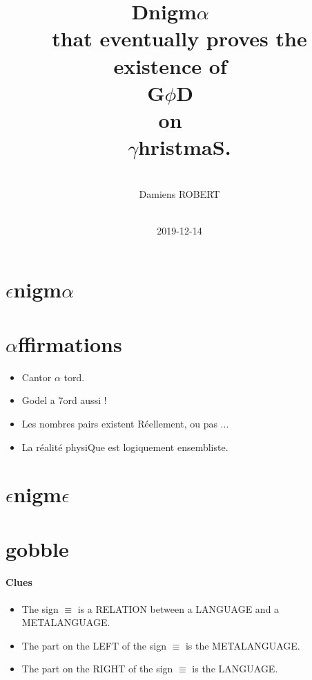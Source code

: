 \documentclass{article}
\title{Dnigm$\alpha$
~\\
that eventually proves the existence of 
~\\
G$\phi$D
~\\
on 
~\\
$\gamma$hristmaS.
}
\date{
~\\
2019-12-14
}
\author{
~\\
Damiens ROBERT
}
\begin{document}
  \maketitle
  \section{$\epsilon$nigm$\alpha$}
    \section{$\alpha$ffirmations}
        \begin{itemize}
          \item
            Cantor $\alpha$ tord.
          \item
            Godel a 7ord aussi ! 
          \item
            Les nombres pairs existent Réellement, ou pas ...
          \item
            La réalité physiQue est logiquement ensembliste.
        \end{itemize}
    \section{$\epsilon$nigm$\epsilon$}
    \section{gobble}
      \paragraph{Clues}
	\begin{itemize}
	  \item
            The sign $\equiv$ is a RELATION between a LANGUAGE and a METALANGUAGE.
	  \item
            The part on the LEFT of the sign $\equiv$ is the METALANGUAGE.
	  \item
            The part on the RIGHT of the sign $\equiv$ is the LANGUAGE.
	\end{itemize}
\end{document}
